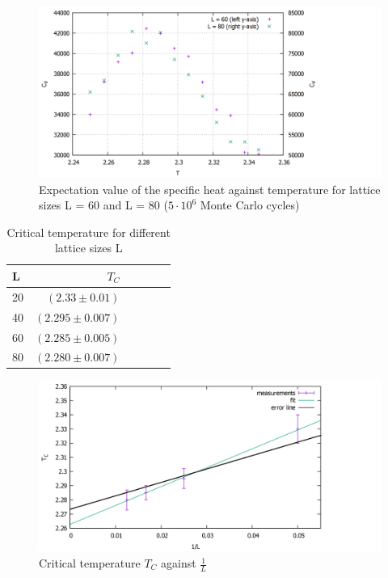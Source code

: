 \documentclass[10pt,a4paper]{article}
\begin{document}
\begin{figure}[h]
	\includegraphics[scale = 0.25]{cv6080.png}
	\centering
	\caption{Expectation value of the specific heat against temperature for lattice sizes L = 60 and L = 80 ($5 \cdot 10^6$ Monte Carlo cycles)}
	\label{cv6080}
\end{figure}

\begin{table}[h!]
	\centering
	\begin{tabular}{|l|r|c|lrp{16cm}}\hline
		L & $T_C$ \\\hline
		20 & $(2.33 \pm 0.01)$\\
		40 & $(2.295 \pm 0.007)$\\
		60 & $(2.285 \pm 0.005)$\\
		80 & $(2.280 \pm 0.007)$\\\hline
	\end{tabular}
	\caption{Critical temperature for different lattice sizes L }
	\label{tc}
\end{table}

\begin{figure}[h]
	\includegraphics[scale = 0.25]{tc2.png}
	\centering
	\caption{Critical temperature $T_C$ against $\frac{1}{L}$}
	\label{tc2}
\end{figure}
\end{document}
